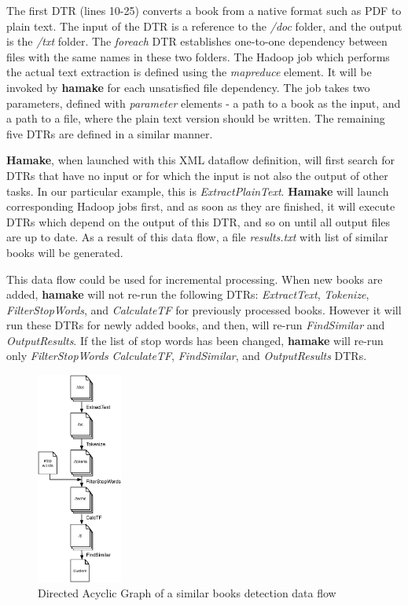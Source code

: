 \documentclass[10pt,conference,letterpaper]{IEEEtran}
\begin{document}


The first DTR (lines 10-25) converts a book from a native format such
as PDF to plain text. The input of the DTR is a reference to the
\emph{/doc} folder, and the output is the \emph{/txt} folder. The
\emph{foreach} DTR establishes one-to-one dependency between files
with the same names in these two folders. The Hadoop job which
performs the actual text extraction is defined using the \emph{mapreduce}
element. It will be invoked by \textbf{hamake} for each unsatisfied
file dependency. The job takes two parameters, defined with
\emph{parameter} elements - a path to a book as the input, and a path to a
file, where the plain text version should be written. The remaining five
DTRs are defined in a similar manner.

\textbf{Hamake}, when launched with this XML dataflow definition, will
first search for DTRs that have no input or for which the input is not also the
output of other tasks. In our particular example, this is
\emph{ExtractPlainText}. \textbf{Hamake} will launch corresponding
Hadoop jobs first, and as soon as they are finished, it will
execute DTRs which depend on the output of this DTR, and so on until all
output files are up to date. As a result of this data flow, a file
\emph{results.txt} with list of similar books will be generated.

This data flow could be used for incremental processing. When new
books are added, \textbf{hamake} will not re-run the following DTRs:
\emph{ExtractText}, \emph{Tokenize}, \emph{FilterStopWords}, and
\emph{CalculateTF} for previously processed books. However it will run
these DTRs for newly added books, and then, will re-run
\emph{FindSimilar} and \emph{OutputResults}.  If the list of stop
words has been changed, \textbf{hamake} will re-run only
\emph{FilterStopWords} \emph{CalculateTF}, \emph{FindSimilar}, and
\emph{OutputResults} DTRs.

\begin{figure}[htp]
\centering
\includegraphics[width=0.25\textwidth]{SimilarityAlgDAG.eps}
\caption{Directed Acyclic Graph of a similar books detection data flow}
\label{fig:SimilarityAlgDAG}
\end{figure}
\end{document}
